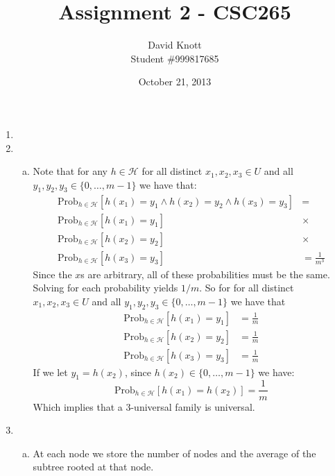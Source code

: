 \documentclass[letterpaper,10pt]{article}
\begin{document}
\title{Assignment 2 - CSC265}
\author{David Knott \\  Student \#999817685}
\date{October 21, 2013}
\maketitle
\begin{enumerate}
	\item 

	\item 
	\begin{enumerate}[a)]
		\item Note that for any $h \in \mathcal{H}$ for all distinct $x_1,x_2,x_3 \in U$ and all $y_1,y_2,y_3 \in \{0,\dots,m-1\}$ we have that:
		\begin{align*}
		\text{Prob}_{h\in\mathcal{H}}[ h(x_1) = y_1 \wedge h(x_2) = y_2 \wedge h(x_3) = y_3 ] & = \\
		\text{Prob}_{h\in\mathcal{H}}[h(x_1) = y_1] & \times \\
		\text{Prob}_{h\in\mathcal{H}}[h(x_2) = y_2] & \times \\
		\text{Prob}_{h\in\mathcal{H}}[h(x_3) = y_3] & = \frac{1}{m^3}
		\end{align*}
		Since the $x$s are arbitrary, all of these probabilities must be the same. Solving for each probability yields $1/m$. So for for all distinct $x_1,x_2,x_3 \in U$ and all $y_1,y_2,y_3 \in \{0,\dots,m-1\}$ we have that 
		\begin{align*}
		\text{Prob}_{h\in\mathcal{H}}[h(x_1) = y_1] & = \frac{1}{m} \\
		\text{Prob}_{h\in\mathcal{H}}[h(x_2) = y_2] & = \frac{1}{m} \\
		\text{Prob}_{h\in\mathcal{H}}[h(x_3) = y_3] & = \frac{1}{m}
		\end{align*}
		If we let $y_1 = h(x_2)$, since $h(x_2) \in \{0,\dots,m-1 \}$ we have:
		$$ \text{Prob}_{h\in\mathcal{H}}[h(x_1) = h(x_2)] = \frac{1}{m} $$
		Which implies that a 3-universal family is universal.
	\end{enumerate}
	\clearpage

	\item
	\begin{enumerate}[a)]
		\item At each node we store the number of nodes and the average of the subtree rooted at that node.


\end{enumerate}
\end{enumerate}
\end{document}
